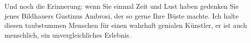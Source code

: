 \pstart
           \noindent{}Und noch die Erinnerung: wenn Sie einmal Zeit und Lust haben gedenken Sie jenes
                  Bildhauers Gustinus Ambrosi, der so gerne
                  Ihre Büste machte. Ich halte diesen taubstummen Menschen für einen wahrhaft
                  genialen Künstler, er ist auch menschlich, ein unvergleichliches Erlebnis.\pend
           \endnumbering{}
\begin{anhang}
\end{anhang}
      